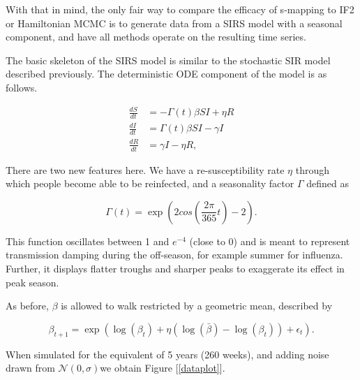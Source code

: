 \documentclass[12pt]{article}
\begin{document}
	With that in mind, the only fair way to compare the efficacy of s-mapping to IF2 or Hamiltonian MCMC is to generate data from a SIRS model with a seasonal component, and have all methods operate on the resulting time series.

	The basic skeleton of the SIRS model is similar to the stochastic SIR model described previously. The deterministic ODE component of the model is as follows.

	\begin{equation}
		\begin{aligned}
			\frac{dS}{dt} & = - \Gamma(t) \beta S I + \eta R \\
			\frac{dI}{dt} & = \Gamma(t) \beta S I - \gamma I \\
			\frac{dR}{dt} & = \gamma I - \eta R,
		\end{aligned}
	\end{equation}

	There are two new features here. We have a re-susceptibility rate $\eta$ through which people become able to be reinfected, and a seasonality factor $\Gamma$ defined as

	\begin{equation}
		\Gamma(t) = \exp \left( 2 cos \left(  \frac{2 \pi}{365} t \right) - 2 \right) .
	\end{equation}

	This function oscillates between 1 and $e^{-4}$ (close to 0) and is meant to represent transmission damping during the off-season, for example summer for influenza. Further, it displays flatter troughs and sharper peaks to exaggerate its effect in peak season.

	As before, $\beta$ is allowed to walk restricted by a geometric mean, described by

	\begin{equation}
		\beta_{t+1} = \exp \left( \log(\beta_{t}) + \eta (\log(\bar{\beta}) - \log(\beta_{t})) + \epsilon_{t} \right).
	\end{equation}

	When simulated for the equivalent of 5 years (260 weeks), and adding noise drawn from $\mathcal{N}(0,\sigma)$we obtain Figure [\ref{dataplot}].
\end{document}
